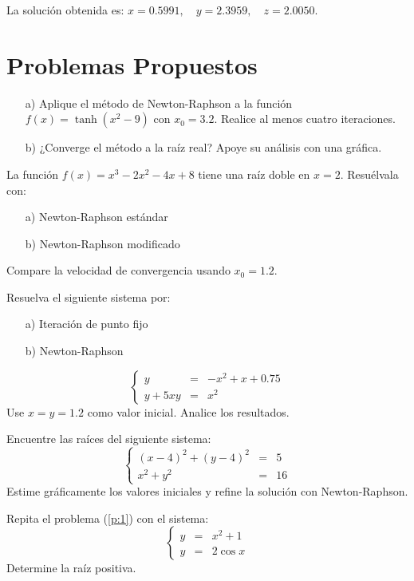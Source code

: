 \documentclass[12pt,letterpaper]{article}
\theoremstyle{definition}
\theoremstyle{plain}
\theoremstyle{remark}
\begin{document}
La solución obtenida es:
\(
x = 0.5991, \quad y = 2.3959, \quad z = 2.0050
\).

\section{Problemas Propuestos}

\begin{multicols}{2}


{\problem 
\begin{itemize}
\item[a)] Aplique el método de Newton-Raphson a la función $f(x) = \tanh(x^2 - 9)$ con $x_0 = 3.2$. Realice al menos cuatro iteraciones.
\item[b)] ¿Converge el método a la raíz real? Apoye su análisis con una gráfica.
\end{itemize}}

{\problem La función $f(x) = x^3 - 2x^2 - 4x + 8$ tiene una raíz doble en $x = 2$. Resuélvala con:
\begin{itemize}
\item[a)] Newton-Raphson estándar
\item[b)] Newton-Raphson modificado
\end{itemize}
Compare la velocidad de convergencia usando $x_0 = 1.2$.}

{\problem Resuelva el siguiente sistema por:
\begin{itemize}
\item[a)] Iteración de punto fijo
\item[b)] Newton-Raphson
\end{itemize}
\[
\left\{
\begin{array}{rcl}
y &=& -x^2 + x + 0.75 \\
y + 5xy &=& x^2
\end{array}
\right.
\]
Use $x = y = 1.2$ como valor inicial. Analice los resultados.}

{\problem\label{p:1} Encuentre las raíces del siguiente sistema:
\[
\left\{
\begin{array}{rcl}
(x - 4)^2 + (y - 4)^2 &=& 5 \\
x^2 + y^2 &=& 16
\end{array}
\right.
\]
Estime gráficamente los valores iniciales y refine la solución con Newton-Raphson.}

{\problem Repita el problema (\ref{p:1}) con el sistema:
\[
\left\{
\begin{array}{rcl}
y &=& x^2 + 1 \\
y &=& 2\cos x
\end{array}
\right.
\]
Determine la raíz positiva.}


\end{multicols}
\end{document}
